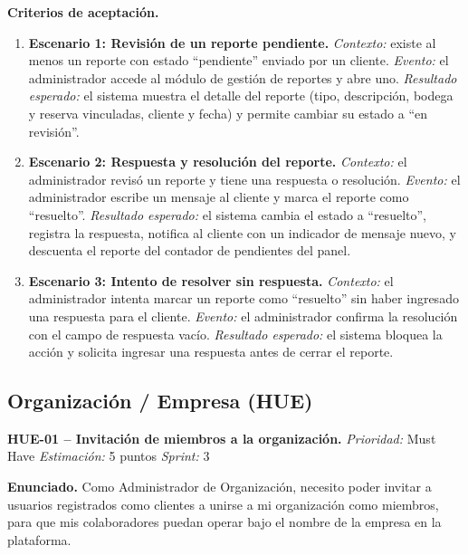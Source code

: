 \textbf{Criterios de aceptación.}
\begin{enumerate}
\item \textbf{Escenario 1: Revisión de un reporte pendiente.} \textit{Contexto:} existe al menos un reporte con estado ``pendiente'' enviado por un cliente. \textit{Evento:} el administrador accede al módulo de gestión de reportes y abre uno. \textit{Resultado esperado:} el sistema muestra el detalle del reporte (tipo, descripción, bodega y reserva vinculadas, cliente y fecha) y permite cambiar su estado a ``en revisión''.
\item \textbf{Escenario 2: Respuesta y resolución del reporte.} \textit{Contexto:} el administrador revisó un reporte y tiene una respuesta o resolución. \textit{Evento:} el administrador escribe un mensaje al cliente y marca el reporte como ``resuelto''. \textit{Resultado esperado:} el sistema cambia el estado a ``resuelto'', registra la respuesta, notifica al cliente con un indicador de mensaje nuevo, y descuenta el reporte del contador de pendientes del panel.
\item \textbf{Escenario 3: Intento de resolver sin respuesta.} \textit{Contexto:} el administrador intenta marcar un reporte como ``resuelto'' sin haber ingresado una respuesta para el cliente. \textit{Evento:} el administrador confirma la resolución con el campo de respuesta vacío. \textit{Resultado esperado:} el sistema bloquea la acción y solicita ingresar una respuesta antes de cerrar el reporte.
\end{enumerate}

\clearpage
\subsection{Organización / Empresa (HUE)}

\textbf{HUE-01 -- Invitación de miembros a la organización.} \label{req:HUE-01}
\textit{Prioridad:} Must Have \quad \textit{Estimación:} 5 puntos \quad \textit{Sprint:} 3

\textbf{Enunciado.} Como Administrador de Organización, necesito poder invitar a usuarios registrados como clientes a unirse a mi organización como miembros, para que mis colaboradores puedan operar bajo el nombre de la empresa en la plataforma.

